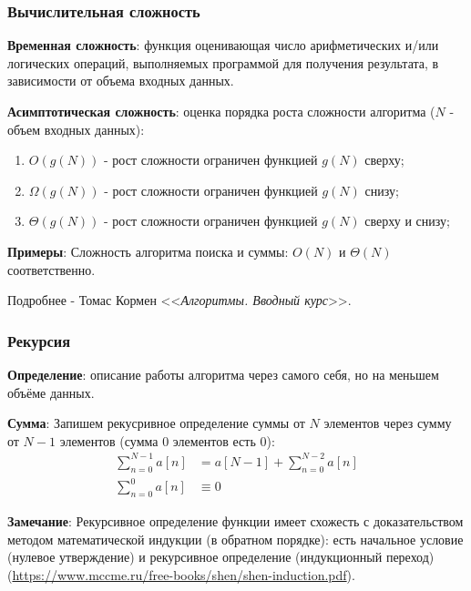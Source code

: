 \documentclass{beamer}
\begin{document}
    \begin{frame}
        \frametitle{Вычислительная сложность}
        \justifying
        {\bf Временная сложность}: функция оценивающая число арифметических и/или логических операций, выполняемых программой для получения результата, в зависимости от объема входных данных.
        \par
        {\bf Асимптотическая сложность}: оценка порядка роста сложности алгоритма ($N$ - объем входных данных):
        \begin{enumerate}
            \item $O(g(N))$ - рост сложности ограничен функцией $g(N)$ сверху;
            \item $\Omega(g(N))$ - рост сложности ограничен функцией $g(N)$ снизу;
            \item $\Theta(g(N))$ - рост сложности ограничен функцией $g(N)$ сверху и снизу;
        \end{enumerate}
        \par
        {\bf Примеры}: Сложность алгоритма поиска и суммы: $O(N)$ и $\Theta(N)$ соответственно.
        \par
        Подробнее - Томас Кормен <<{\it Алгоритмы. Вводный курс}>>.
    \end{frame}
    \begin{frame}
        \frametitle{Рекурсия}
        \justifying
        {\bf Определение}: описание работы алгоритма через самого себя, но на меньшем объёме данных.
        \par
        {\bf Сумма}: Запишем рекусривное определение суммы от $N$ элементов через сумму от $N - 1$ элементов (сумма $0$ элементов есть $0$):
        \begin{equation}
        \begin{split}
            \sum_{n=0}^{N-1}a[n] &= a[N-1] + \sum_{n=0}^{N-2}a[n] \\
            \sum_{n=0}^{0} a[n] &\equiv 0
        \end{split}
        \end{equation}
        \par
        \justifying
        {\bf Замечание}: Рекурсивное определение функции имеет схожесть с доказательством методом математической индукции (в обратном порядке): 
        есть начальное условие (нулевое утверждение) и рекурсивное определение (индукционный переход) (\url{https://www.mccme.ru/free-books/shen/shen-induction.pdf}).
    \end{frame}
\end{document}
